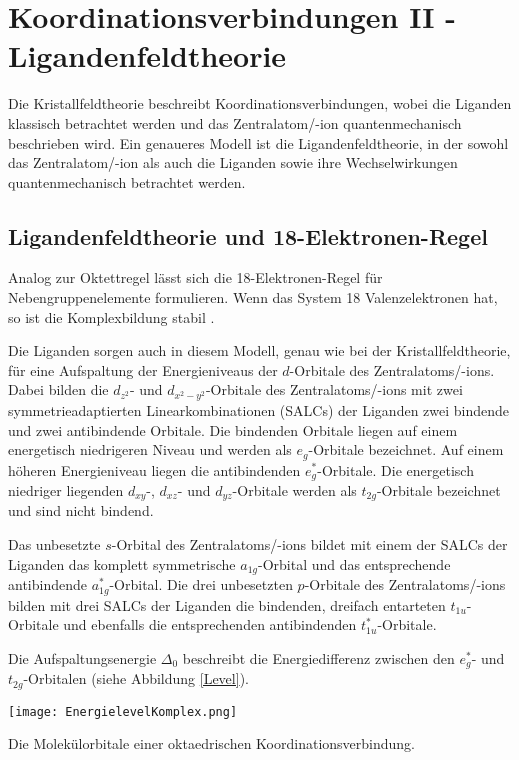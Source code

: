 \section{Koordinationsverbindungen II - Ligandenfeldtheorie}

Die Kristallfeldtheorie beschreibt Koordinationsverbindungen, wobei die Liganden klassisch betrachtet werden und das Zentralatom/-ion quantenmechanisch beschrieben wird. Ein genaueres Modell ist die Ligandenfeldtheorie, in der sowohl das Zentralatom/-ion als auch die Liganden sowie ihre Wechselwirkungen quantenmechanisch betrachtet werden.

\subsection{Ligandenfeldtheorie und 18-Elektronen-Regel}

Analog zur Oktettregel lässt sich die 18-Elektronen-Regel für Nebengruppenelemente formulieren. Wenn das System 18 Valenzelektronen hat, so ist die Komplexbildung stabil \cite{Huheey}.

Die Liganden sorgen auch in diesem Modell, genau wie bei der Kristallfeldtheorie, für eine Aufspaltung der Energieniveaus der $d$-Orbitale des Zentralatoms/-ions. Dabei bilden die $d_{z^2}$- und $d_{x^2-y^2}$-Orbitale des Zentralatoms/-ions mit zwei symmetrieadaptierten Linearkombinationen (SALCs) der Liganden zwei bindende und zwei antibindende Orbitale. Die bindenden Orbitale liegen auf einem energetisch niedrigeren Niveau und werden als $e_g$-Orbitale bezeichnet. Auf einem höheren Energieniveau liegen die antibindenden $e^*_g$-Orbitale. Die energetisch niedriger liegenden $d_{xy}$-, $d_{xz}$- und $d_{yz}$-Orbitale  werden als $t_{2g}$-Orbitale bezeichnet und sind nicht bindend.

Das unbesetzte $s$-Orbital des Zentralatoms/-ions bildet mit einem der SALCs der Liganden das komplett symmetrische $a_{1g}$-Orbital und das entsprechende antibindende $a^*_{1g}$-Orbital. Die drei unbesetzten $p$-Orbitale des Zentralatoms/-ions bilden mit drei SALCs der Liganden die bindenden, dreifach entarteten $t_{1u}$-Orbitale und ebenfalls die entsprechenden antibindenden $t^*_{1u}$-Orbitale.

Die Aufspaltungsenergie $\Delta_0$ beschreibt die Energiedifferenz zwischen den $e^*_g$- und $t_{2g}$-Orbitalen (siehe Abbildung \ref{Level}).

\begin{dsafigure}
	\centering
	\texttt{[image: EnergielevelKomplex.png]}
	\caption{Die Molekülorbitale einer oktaedrischen Koordinationsverbindung. \cite{Chemie_der_Metalle}}
	\label{Level}
\end{dsafigure}

